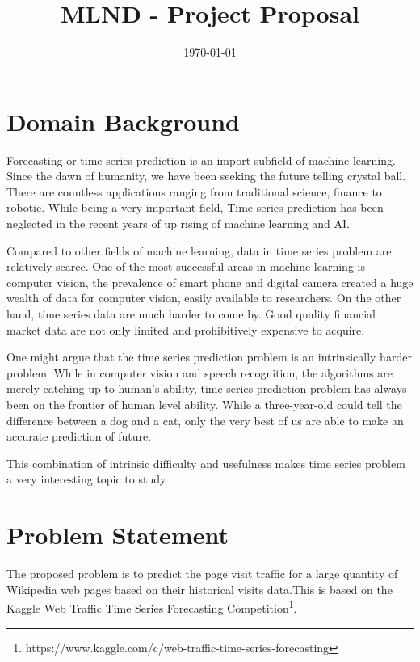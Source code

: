 \documentclass[10pt, a4paper]{article}
\title{MLND - Project Proposal} %
\author{
	\authorstyle{Louis Tian} %
}
\date{\today} %
\begin{document}
\maketitle %

\thispagestyle{firstpage} %




\section{Domain Background}
Forecasting or time series prediction is an import subfield of machine learning. Since the dawn of humanity, we have been seeking the future telling crystal ball. There are countless applications ranging from traditional science, finance to robotic. While being a very important field, Time series prediction has been neglected in the recent years of up rising of machine learning and AI.

Compared to other fields of machine learning, data in time series problem are relatively scarce. One of the most successful areas in machine learning is computer vision, the prevalence of smart phone and digital camera created a huge wealth of data for computer vision, easily available to researchers. On the other hand, time series data are much harder to come by. Good quality financial market data are not only limited and prohibitively expensive to acquire.

One might argue that the time series prediction problem is an intrinsically harder problem. While in computer vision and speech recognition, the algorithms are merely catching up to human's ability, time series prediction problem has always been on the frontier of human level ability. While a three-year-old could tell the difference between a dog and a cat, only the very best of us are able to make an accurate prediction of future.

This combination of intrinsic difficulty and usefulness makes time series problem a very interesting topic to study

\section{Problem Statement}
The proposed problem is to predict the page visit traffic for a large quantity of Wikipedia web pages based on their historical visits data.This is based on the Kaggle Web Traffic Time Series Forecasting Competition\footnote{https://www.kaggle.com/c/web-traffic-time-series-forecasting}.
\end{document}
